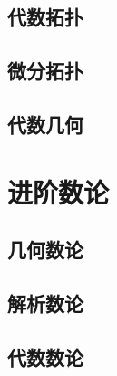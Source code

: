 \documentclass[zihao=false,linespread=1.5,heading=true,a4paper,oneside,fontset=windows]{ctexbook}
\begin{document}
\chapter{代数拓扑}\label{chap:algebraic-topology}


\chapter{微分拓扑}\label{chap:differential-topology}


\chapter{代数几何}\label{chap:algebraic-geometry}


\part{进阶数论}\label{part:advanced-number-theory}

\chapter{几何数论}\label{chap:geometry-of-numbers}


\chapter{解析数论}\label{chap:analytic-number-theory}


\chapter{代数数论}\label{chap:algebraic-number-theory}



\clearpage

\clearpage
{}\label{back:index}
\printindex

\newpage
\thispagestyle{empty}%

\newpage
\end{document}
